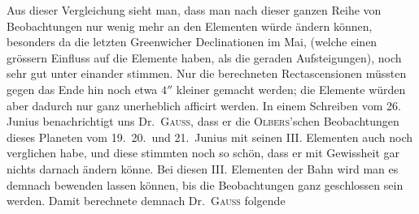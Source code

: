 Aus dieser Vergleichung sieht man, dass man nach dieser ganzen Reihe von Beobachtungen nur wenig mehr an den Elementen würde ändern können, besonders da die letzten Greenwicher Declinationen im Mai, (welche einen grössern Einfluss auf die Elemente haben, als die geraden Aufsteigungen), noch sehr gut unter einander stimmen. Nur die berechneten Rectascensionen müssten gegen das Ende hin noch etwa $4''$ kleiner gemacht werden; die Elemente würden aber dadurch nur ganz unerheblich afficirt werden. In einem Schreiben vom 26. Junius benachrichtigt uns Dr.\ \textsc{Gauss}, dass er die \textsc{Olbers}'schen Beobachtungen dieses Planeten vom 19.\ 20.\ und 21.\ Junius mit seinen III. Elementen auch noch verglichen habe, und diese stimmten noch so schön, dass er mit Gewissheit gar nichts darnach ändern könne. Bei diesen III. Elementen der Bahn wird man es demnach bewenden lassen können, bis die Beobachtungen ganz geschlossen sein werden. Damit berechnete demnach Dr.\ \textsc{Gauss} folgende
